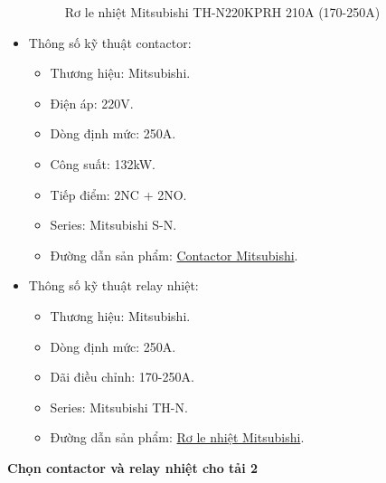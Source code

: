 \begin{itemize}
\begin{figure}[H]
                            \caption{Rơ le nhiệt Mitsubishi TH-N220KPRH 210A (170-250A)}
                        \end{figure}
                    \item Thông số kỹ thuật contactor:
                        \begin{itemize}
                            \item Thương hiệu: Mitsubishi.
                            \item Điện áp: 220V.
                            \item Dòng định mức: 250A.
                            \item Công suất: 132kW.
                            \item Tiếp điểm: 2NC + 2NO.
                            \item Series: Mitsubishi S-N.
                            \item Đường dẫn sản phẩm: \href{https://codienhaiau.com/product/cong-tac-to-dang-khoi-mitsubishi-s-n220-ac200v/}{Contactor Mitsubishi}.
                        \end{itemize}
                    \item Thông số kỹ thuật relay nhiệt:
                        \begin{itemize}
                            \item Thương hiệu: Mitsubishi.
                            \item Dòng định mức: 250A.
                            \item Dãi điều chỉnh: 170-250A.
                            \item Series: Mitsubishi TH-N.
                            \item Đường dẫn sản phẩm: \href{https://codienhaiau.com/product/ro-le-nhiet-mitsubishi-th-n220kprh-210a/}{Rơ le nhiệt Mitsubishi}.
                        \end{itemize}
                \end{itemize}
            \textbf{Chọn contactor và relay nhiệt cho tải 2}
